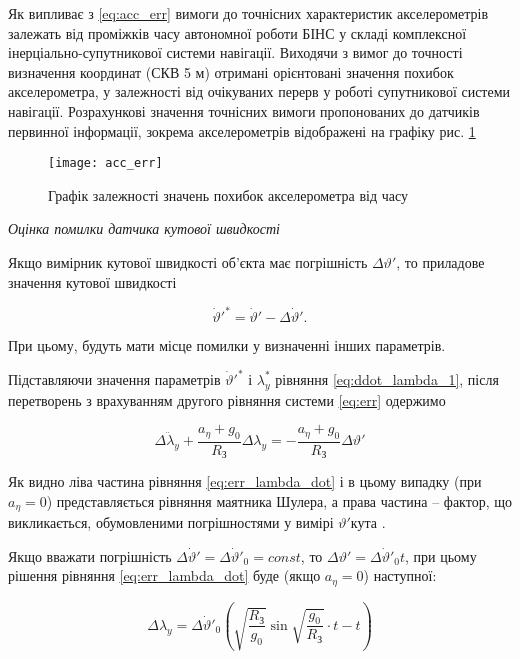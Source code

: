 Як випливає з \eqref{eq:acc_err} вимоги до точнісних характеристик акселерометрів залежать від проміжків часу 
автономної роботи БІНС у складі комплексної інерціально-супутникової системи навігації. Виходячи з вимог до 
точності визначення координат (СКВ  5 м) отримані орієнтовані значення похибок акселерометра, у залежності 
від очікуваних перерв у роботі супутникової системи навігації. Розрахункові значення точнісних вимоги 
пропонованих до датчиків первинної інформації, зокрема акселерометрів відображені на графіку рис. \ref{fig:acc_err} 

\begin{figure}
\centering
\texttt{[image: acc\_err]}
\caption{Графік залежності значень похибок акселерометра від часу}
\label{fig:acc_err}
\end{figure} 
\vline 

\textit{Оцінка помилки датчика кутової швидкості}

Якщо вимірник кутової швидкості об'єкта має погрішність $\Delta \vartheta '$, то приладове значення кутової швидкості

\[\dot{\vartheta }'^{*} =\dot{\vartheta }'-\Delta \dot{\vartheta }'.\] 

При цьому, будуть мати місце помилки у визначенні інших параметрів.

Підставляючи значення параметрів $\dot{\vartheta }'^{*} $ і  $\lambda _{y}^{*} $ рівняння \eqref{eq:ddot_lambda_1},  після перетворень з врахуванням другого рівняння системи \eqref{eq:err} одержимо

\begin{equation} 
\label{eq:err_lambda_dot} 
\Delta \ddot{\lambda }_{y} +\frac{a_{\eta } +g_{0} }{R_{\text{З}} } \Delta \lambda _{y} =-\frac{a_{\eta } +g_{0} }{R_{\text{З}} } \Delta \vartheta ' 
\end{equation} 

Як видно ліва частина рівняння \eqref{eq:err_lambda_dot} і в цьому випадку (при $a_{\eta } =0$) представляється рівняння маятника Шулера, а права частина -- фактор, що викликається, обумовленими погрішностями у вимірі $\vartheta '$кута .

Якщо вважати погрішність $\Delta \dot{\vartheta }'=\Delta \dot{\vartheta }'_{0} =const$, то $\Delta \vartheta '=\Delta \dot{\vartheta }'_{0} t$, при цьому рішення рівняння 
\eqref{eq:err_lambda_dot} буде (якщо $a_{\eta } =0$) наступної:

\begin{equation} 
\label{eq:err_lambda_delta} 
\Delta \lambda _{y} =\Delta \dot{\vartheta }'_{0} \left(\sqrt{\frac{R_{\text{З}} }{g_{0} } } \sin \sqrt{\frac{g_{0} }{R_{\text{З}} } } \cdot t-t\right)
\end{equation} 


